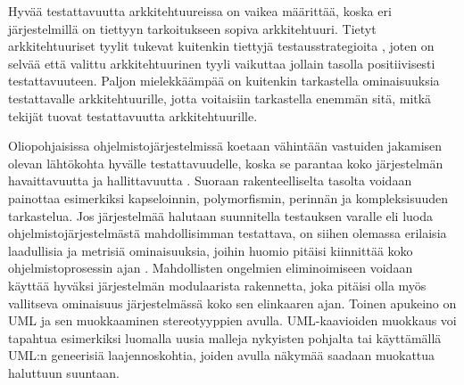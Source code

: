 \documentclass[finnish]{tktltiki2}
\numberwithin{table}{section}
\theoremstyle{definition}
\theoremstyle{remark}
\begin{document}
 
Hyvää testattavuutta arkkitehtuureissa on vaikea määrittää, koska eri järjestelmillä on tiettyyn tarkoitukseen sopiva arkkitehtuuri. Tietyt arkkitehtuuriset tyylit tukevat kuitenkin tiettyjä testausstrategioita \citep{Eickelmann:1996:MOS:243327.243602}, joten on selvää että valittu arkkitehtuurinen tyyli vaikuttaa jollain tasolla positiivisesti testattavuuteen. Paljon mielekkäämpää on kuitenkin tarkastella  ominaisuuksia testattavalle arkkitehtuurille, jotta voitaisiin tarkastella enemmän sitä, mitkä tekijät tuovat testattavuutta arkkitehtuurille.

Oliopohjaisissa ohjelmistojärjestelmissä koetaan vähintään vastuiden jakamisen olevan lähtökohta hyvälle testattavuudelle, koska se parantaa koko järjestelmän havaittavuutta ja hallittavuutta \citep{Binder:1994:DTO:182987.184077}. Suoraan rakenteelliselta tasolta voidaan painottaa esimerkiksi kapseloinnin, polymorfismin, perinnän ja kompleksisuuden tarkastelua. Jos järjestelmää halutaan suunnitella testauksen varalle eli luoda ohjelmistojärjestelmästä mahdollisimman testattava, on siihen olemassa erilaisia laadullisia ja metrisiä ominaisuuksia, joihin huomio pitäisi kiinnittää koko ohjelmistoprosessin ajan \citep{joshi_design_2014}. Mahdollisten ongelmien eliminoimiseen voidaan käyttää hyväksi järjestelmän modulaarista rakennetta, joka pitäisi olla myös vallitseva ominaisuus järjestelmässä koko sen elinkaaren ajan. Toinen apukeino on UML ja sen  muokkaaminen stereotyyppien avulla. UML-kaavioiden muokkaus voi tapahtua esimerkiksi luomalla uusia malleja nykyisten pohjalta tai käyttämällä UML:n geneerisiä laajennoskohtia, joiden avulla näkymää saadaan muokattua haluttuun suuntaan.



\end{document}
